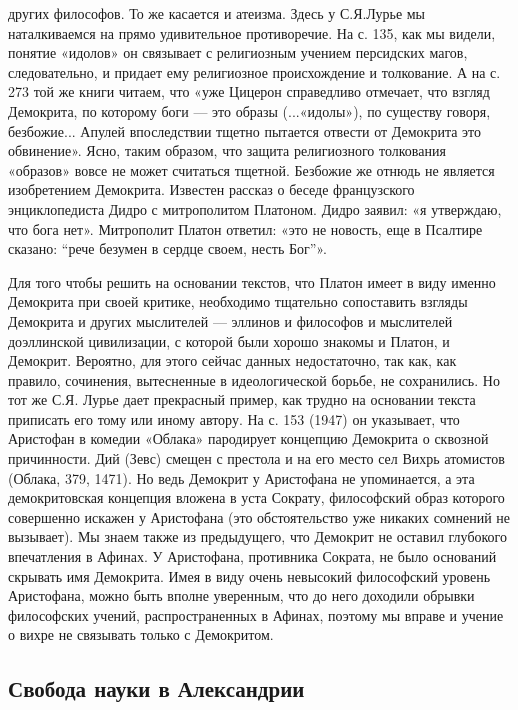 других  философов. То  же касается  и  атеизма. Здесь  у С.Я.Лурье  мы
наталкиваемся на  прямо удивительное противоречие.  На с. 135,  как мы
видели, понятие «идолов» он связывает с религиозным учением персидских
магов,  следовательно,  и  придает  ему  религиозное  происхождение  и
толкование.  А  на с.  273  той  же  книги  читаем, что  «уже  Цицерон
справедливо  отмечает,  что взгляд  Демокрита,  по  которому боги  ---
это  образы  (...«идолы»),  по  существу  говоря,  безбожие...  Апулей
впоследствии  тщетно пытается  отвести  от  Демокрита это  обвинение».
Ясно,  таким образом,  что  защита  религиозного толкования  «образов»
вовсе  не может  считаться  тщетной. Безбожие  же  отнюдь не  является
изобретением  Демокрита.   Известен  рассказ  о   беседе  французского
энциклопедиста  Дидро  с  митрополитом   Платоном.  Дидро  заявил:  «я
утверждаю, что бога нет». Митрополит  Платон ответил: «это не новость,
еще в Псалтире сказано: ``рече безумен в сердце своем, несть Бог''».

Для того  чтобы решить на основании  текстов, что Платон имеет  в виду
именно Демокрита  при своей критике, необходимо  тщательно сопоставить
взгляды  Демокрита  и других  мыслителей  ---  эллинов и  философов  и
мыслителей доэллинской  цивилизации, с  которой были хорошо  знакомы и
Платон, и  Демокрит. Вероятно,  для этого сейчас  данных недостаточно,
так как, как правило,  сочинения, вытесненные в идеологической борьбе,
не  сохранились. Но  тот же  С.Я.  Лурье дает  прекрасный пример,  как
трудно  на  основании текста  приписать  его  тому или  иному  автору.
На  с. 153  (1947)  он  указывает, что  Аристофан  в комедии  «Облака»
пародирует  концепцию Демокрита  о  сквозной  причинности. Дий  (Зевс)
смещен  с  престола  и  на  его место  сел  Вихрь  атомистов  (Облака,
379,  1471). Но  ведь  Демокрит  у Аристофана  не  упоминается, а  эта
демокритовская  концепция вложена  в уста  Сократу, философский  образ
которого  совершенно  искажен  у Аристофана  (это  обстоятельство  уже
никаких  сомнений не  вызывает). Мы  знаем также  из предыдущего,  что
Демокрит  не оставил  глубокого  впечатления в  Афинах. У  Аристофана,
противника Сократа, не  было оснований скрывать имя  Демокрита. Имея в
виду  очень  невысокий  философский  уровень  Аристофана,  можно  быть
вполне  уверенным, что  до него  доходили обрывки  философских учений,
распространенных  в Афинах,  поэтому мы  вправе  и учение  о вихре  не
связывать только с Демокритом.

\subsection{Свобода науки в Александрии}

